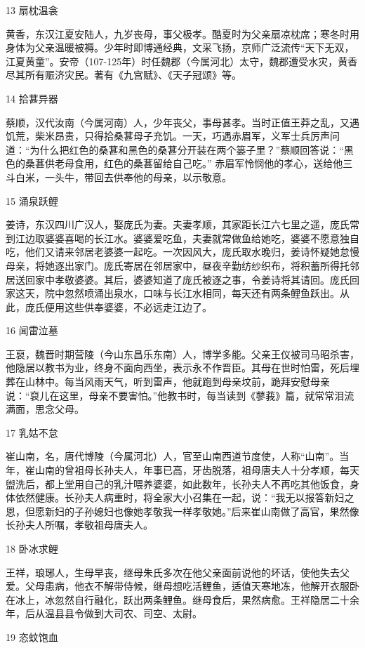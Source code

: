 \documentclass[12pt,a4paper]{article}
\begin{document}
13 扇枕温衾

黄香，东汉江夏安陆人，九岁丧母，事父极孝。酷夏时为父亲扇凉枕席；寒冬时用身体为父亲温暖被褥。少年时即博通经典，文采飞扬，京师广泛流传“天下无双，江夏黄童”。安帝（107-125年）时任魏郡（今属河北）太守，魏郡遭受水灾，黄香尽其所有赈济灾民。著有《九宫赋》、《天子冠颂》等。

14 拾葚异器

蔡顺，汉代汝南（今属河南）人，少年丧父，事母甚孝。当时正值王莽之乱，又遇饥荒，柴米昂贵，只得拾桑葚母子充饥。一天，巧遇赤眉军，义军士兵厉声问道：“为什么把红色的桑葚和黑色的桑葚分开装在两个篓子里？”蔡顺回答说：“黑色的桑葚供老母食用，红色的桑葚留给自己吃。” 赤眉军怜悯他的孝心，送给他三斗白米，一头牛，带回去供奉他的母亲，以示敬意。

15 涌泉跃鲤

姜诗，东汉四川广汉人，娶庞氏为妻。夫妻孝顺，其家距长江六七里之遥，庞氏常到江边取婆婆喜喝的长江水。婆婆爱吃鱼，夫妻就常做鱼给她吃，婆婆不愿意独自吃，他们又请来邻居老婆婆一起吃。一次因风大，庞氏取水晚归，姜诗怀疑她怠慢母亲，将她逐出家门。庞氏寄居在邻居家中，昼夜辛勤纺纱织布，将积蓄所得托邻居送回家中孝敬婆婆。其后，婆婆知道了庞氏被逐之事，令姜诗将其请回。庞氏回家这天，院中忽然喷涌出泉水，口味与长江水相同，每天还有两条鲤鱼跃出。从此，庞氏便用这些供奉婆婆，不必远走江边了。

16 闻雷泣墓

王裒，魏晋时期营陵（今山东昌乐东南）人，博学多能。父亲王仪被司马昭杀害，他隐居以教书为业，终身不面向西坐，表示永不作晋臣。其母在世时怕雷，死后埋葬在山林中。每当风雨天气，听到雷声，他就跑到母亲坟前，跪拜安慰母亲说：“裒儿在这里，母亲不要害怕。”他教书时，每当读到《蓼莪》篇，就常常泪流满面，思念父母。

17 乳姑不怠

崔山南，名，唐代博陵（今属河北）人，官至山南西道节度使，人称“山南”。当年，崔山南的曾祖母长孙夫人，年事已高，牙齿脱落，祖母唐夫人十分孝顺，每天盥洗后，都上堂用自己的乳汁喂养婆婆，如此数年，长孙夫人不再吃其他饭食，身体依然健康。长孙夫人病重时，将全家大小召集在一起，说：“我无以报答新妇之恩，但愿新妇的子孙媳妇也像她孝敬我一样孝敬她。”后来崔山南做了高官，果然像长孙夫人所嘱，孝敬祖母唐夫人。

18 卧冰求鲤

王祥，琅琊人，生母早丧，继母朱氏多次在他父亲面前说他的坏话，使他失去父爱。父母患病，他衣不解带侍候，继母想吃活鲤鱼，适值天寒地冻，他解开衣服卧在冰上，冰忽然自行融化，跃出两条鲤鱼。继母食后，果然病愈。王祥隐居二十余年，后从温县县令做到大司农、司空、太尉。

19 恣蚊饱血
\end{document}
